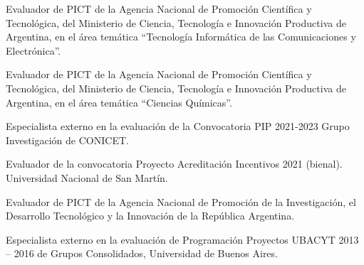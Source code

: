  Evaluador de PICT de la Agencia Nacional de Promoción Científica y Tecnológica, del Ministerio de Ciencia, Tecnología e 
Innovación Productiva de Argentina, en el área temática ``Tecnología Informática de las Comunicaciones y Electrónica''.

 Evaluador de PICT de la Agencia Nacional de Promoción Científica y Tecnológica, del Ministerio de Ciencia, Tecnología e 
Innovación Productiva de Argentina, en el área temática ``Ciencias Químicas''.

 Especialista externo en la evaluación de la Convocatoria PIP 2021-2023 Grupo Investigación de CONICET.

 Evaluador de la convocatoria Proyecto Acreditación Incentivos 2021 (bienal). Universidad Nacional de San Martín.

 Evaluador de PICT de la Agencia Nacional de Promoción de la Investigación, el Desarrollo Tecnológico y la Innovación de la República Argentina.

 Especialista externo en la evaluación de Programación Proyectos UBACYT 2013 -- 2016 de Grupos Consolidados, Universidad de Buenos Aires.


